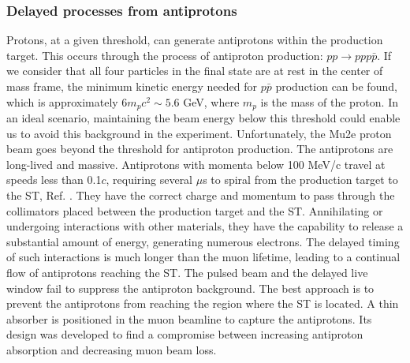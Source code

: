 \subsubsection{Delayed processes from antiprotons}
Protons, at a given threshold, can generate antiprotons 
within the production target. This occurs through the 
process of antiproton production: $pp \rightarrow ppp\bar{p}$. 
If we consider that all four particles in the final state are 
at rest in the center of mass frame, the minimum kinetic energy 
needed for $p\bar{p}$ production can be found, which is 
approximately $6 m_pc^2 \sim 5.6$ GeV, where $m_p$ is the 
mass of the proton. In an ideal scenario, maintaining the 
beam energy below this threshold could enable us to avoid 
this background in the experiment. Unfortunately, the Mu2e 
proton beam goes beyond the threshold for antiproton production. 
The antiprotons are long-lived and massive. Antiprotons with 
momenta below 100 MeV/c travel at speeds less than 0.1$c$, 
requiring several $\mu$s to spiral from the production target 
to the ST, Ref. \cite{bartoszek2015mu2e}. They have the correct 
charge and momentum to pass through the collimators placed 
between the production target and the ST. Annihilating or 
undergoing interactions with other materials, they have the 
capability to release a substantial amount of energy, generating 
numerous electrons. The delayed timing of 
such interactions is much longer than the muon lifetime, leading to a 
continual flow of antiprotons reaching the ST. The pulsed beam and 
the delayed live window fail to suppress the antiproton background. 
The best approach is to prevent the antiprotons from reaching the 
region where the ST is located.
{\red A thin absorber is positioned in 
the muon beamline to capture the antiprotons. Its design was 
developed to find a compromise between increasing antiproton 
absorption and decreasing muon beam loss. }



